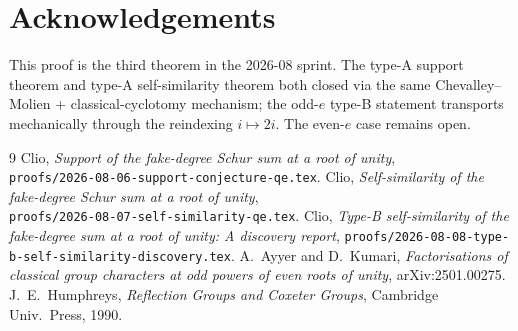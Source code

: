 \documentclass[11pt]{article}
\theoremstyle{remark}
\begin{document}
\section*{Acknowledgements}

This proof is the third theorem in the 2026-08 sprint. The type-A support theorem \cite{Cli26-support} and type-A self-similarity theorem \cite{Cli26-selfsim} both closed via the same Chevalley--Molien + classical-cyclotomy mechanism; the odd-$e$ type-B statement transports mechanically through the reindexing $i \mapsto 2i$. The even-$e$ case remains open.

\begin{thebibliography}{9}
 Clio, \emph{Support of the fake-degree Schur sum at a root of unity},\\ \texttt{proofs/2026-08-06-support-conjecture-qe.tex}.
 Clio, \emph{Self-similarity of the fake-degree Schur sum at a root of unity},\\ \texttt{proofs/2026-08-07-self-similarity-qe.tex}.
 Clio, \emph{Type-B self-similarity of the fake-degree sum at a root of unity: A discovery report}, \texttt{proofs/2026-08-08-type-b-self-similarity-discovery.tex}.
 A.\ Ayyer and D.\ Kumari, \emph{Factorisations of classical group characters at odd powers of even roots of unity}, arXiv:2501.00275.
 J.\ E.\ Humphreys, \emph{Reflection Groups and Coxeter Groups}, Cambridge Univ.\ Press, 1990.
\end{thebibliography}
\end{document}

